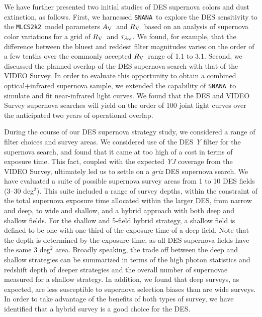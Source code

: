 \documentclass[preprint2]{aastex}    %
\newcommand\rv{$R_{\rm V}$}
\newcommand\av{$A_{\rm V}$}
\newcommand\tauav{$\tau_{A_{\rm V}}$}
\newcommand{\mlcs}{{\tt MLCS2k2}}
\newcommand{\snana}{{\tt SNANA}}
\begin{document}
We have further presented two initial studies of DES supernova colors and dust extinction, 
as follows. First, we harnessed \snana\ to explore the DES sensitivity to the \mlcs\ 
model parameters \av\ and \rv\ based on an analysis of supernova color variations 
for a grid of \rv\ and \tauav. We found, for example, that the difference between the 
bluest and reddest
filter magnitudes varies on the order of a few tenths over the commonly accepted \rv\ range 
of 1.1 to 3.1. Second, we discussed the planned overlap of the DES supernova search with that
of the VIDEO Survey. In order to evaluate this opportunity to obtain a combined
optical+infrared supernova sample, we extended the capability of \snana\ to simulate and 
fit near-infrared light curves. We found that the DES and VIDEO Survey supernova
searches will yield on the order of 100 joint light curves over the anticipated two years
of operational overlap.

During the course of our DES %
supernova strategy study, we considered a range of filter choices 
and survey areas. We considered use of the DES \textit{Y} filter for the 
supernova search, and found that it came at too high of a cost in terms of exposure time.
This fact, coupled with the expected \textit{YJ} coverage from the VIDEO Survey,
ultimately led us to settle on a \textit{griz} DES supernova search. We have evaluated a 
suite of possible supernova survey areas from 1 to 10 DES fields 
(3--30 deg$^2$). This suite included a range of survey depths, within the constraint
of the total supernova exposure time allocated within the larger DES, from narrow and deep, 
to wide and shallow, and a hybrid approach with both deep and shallow fields. For the 
shallow and 5-field hybrid strategy, a shallow field is defined to be one 
with one third of the exposure time of a deep field. Note that the depth is determined by 
the exposure time, as all DES supernova fields have the same 3 deg$^2$ area.
Broadly speaking, the trade off between the deep and shallow strategies
can be summarized in terms of the high photon statistics and redshift depth of deeper 
strategies and the overall number of supernovae measured for a shallow strategy. In addition,
we found that deep surveys, as expected, are less susceptible to supernova selection biases 
than are wide surveys. In order to take advantage of the benefits of both types of survey,
we have identified that a hybrid survey is %
a good choice for the DES.
\end{document}
